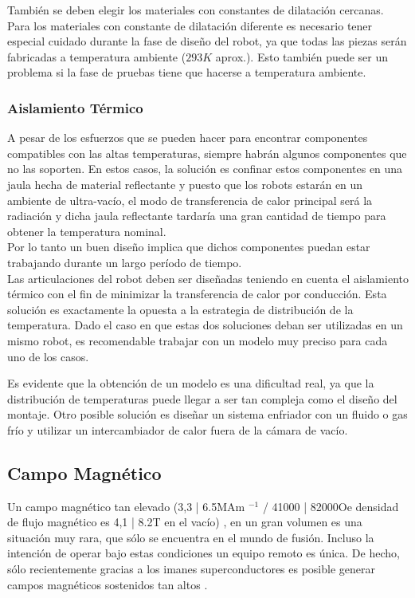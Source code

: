 También se deben elegir los materiales con constantes de dilatación cercanas. Para los materiales con constante de dilatación diferente es necesario tener especial cuidado durante la fase de diseño del robot, ya que todas las piezas serán fabricadas a temperatura ambiente ($293 K $  aprox.). Esto también puede ser un problema si la fase de pruebas tiene que hacerse a temperatura ambiente.

\subsubsection*{Aislamiento Térmico}
A pesar de los esfuerzos que se pueden hacer para encontrar componentes compatibles con las altas temperaturas, siempre habrán algunos componentes que no las soporten. En estos casos, la solución es confinar estos componentes en una jaula hecha de material reflectante y puesto que los robots estarán en un ambiente de ultra-vacío, el modo de transferencia de calor principal será la radiación y dicha jaula reflectante tardaría una gran cantidad de tiempo para obtener la temperatura nominal.\\


Por lo tanto un buen diseño implica que dichos componentes puedan estar trabajando durante un largo período de tiempo.\\


Las articulaciones del robot deben ser diseñadas teniendo en cuenta el aislamiento térmico con el fin de minimizar la transferencia de calor por conducción. Esta solución es exactamente la opuesta a la estrategia de distribución de la temperatura. Dado el caso en que estas dos soluciones deban ser utilizadas en un mismo robot, es recomendable trabajar con un modelo muy preciso para cada uno de los casos.

Es evidente que la obtención de un modelo es una dificultad real, ya que la distribuci\'on de temperaturas puede llegar a ser tan compleja como el diseño del montaje. Otro posible solución es diseñar un sistema enfriador con un fluido o gas frío y utilizar un intercambiador de calor fuera de la cámara de vacío.

\subsection*{Campo Magnético}
Un campo magnético tan elevado (3,3 | 6.5MAm $^ {-1} $ / 41000 | 82000Oe densidad de flujo magnético es 4,1 | 8.2T en el vacío) \cite{Izard2009}, en un gran volumen es una situación muy rara, que sólo se encuentra en el mundo de fusión. Incluso la intención de operar bajo estas condiciones un equipo  remoto es única. De hecho, sólo recientemente gracias a los imanes superconductores  es posible generar campos magnéticos sostenidos tan altos \cite{Kiyoshi2006}.\\


